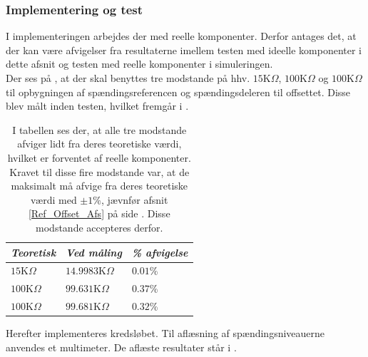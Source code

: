 \subsubsection{Implementering og test}
I implementeringen arbejdes der med reelle komponenter. Derfor antages det, at der kan være afvigelser fra resultaterne imellem testen med ideelle komponenter i dette afsnit og testen med reelle komponenter i simuleringen. \\
Der ses på , at der skal benyttes tre modstande på hhv. $15$K$\Omega$, $100$K$\Omega$ og $100$K$\Omega$ til opbygningen af spændingsreferencen og spændingsdeleren til offsettet. Disse blev målt inden testen, hvilket fremgår i .

\begin{table}[H]
	\centering
	\begin{tabular}{|l|l|l|}
		\hline
		\textit{Teoretisk} & \textit{Ved måling} & \textit{\% afvigelse} \\ \hline
		$15$K$\Omega$       & $14.9983$K$\Omega$   & $0.01$\%               \\ \hline
		$100$K$\Omega$      & $99.631$K$\Omega$    & $0.37$\%               \\ \hline
		$100$K$\Omega$      & $99.681$K$\Omega$    & $0.32$\%               \\ \hline
	\end{tabular}
	\caption{I tabellen ses der, at alle tre modstande afviger lidt fra deres teoretiske værdi, hvilket er forventet af reelle komponenter. Kravet til disse fire modstande var, at de maksimalt må afvige fra deres teoretiske værdi med $\pm1\%$, jævnfør afsnit \ref{Ref_Offset_Afs} på side \pageref{Ref_Offset_Afs}. Disse modstande accepteres derfor.}
	\label{Tab:modstand_Kompar}
\end{table}
\noindent Herefter implementeres kredsløbet. Til aflæsning af spændingsniveauerne anvendes et multimeter. De aflæste resultater står i .
